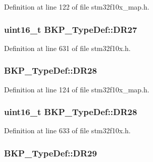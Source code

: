 Definition at line 122 of file stm32f10x\+\_\+map.\+h.

\subsubsection[{\texorpdfstring{D\+R27}{DR27}}]{ {\bf uint16\+\_\+t} B\+K\+P\+\_\+\+Type\+Def\+::\+D\+R27}\hypertarget{struct_b_k_p___type_def_ad5e851ff7c4e78c3ec10bedf4cbec918}{}\label{struct_b_k_p___type_def_ad5e851ff7c4e78c3ec10bedf4cbec918}


Definition at line 631 of file stm32f10x.\+h.

\subsubsection[{\texorpdfstring{D\+R28}{DR28}}]{ B\+K\+P\+\_\+\+Type\+Def\+::\+D\+R28}\hypertarget{struct_b_k_p___type_def_afa8097c9d734aaba46f287d38e562032}{}\label{struct_b_k_p___type_def_afa8097c9d734aaba46f287d38e562032}


Definition at line 124 of file stm32f10x\+\_\+map.\+h.

\subsubsection[{\texorpdfstring{D\+R28}{DR28}}]{ {\bf uint16\+\_\+t} B\+K\+P\+\_\+\+Type\+Def\+::\+D\+R28}\hypertarget{struct_b_k_p___type_def_a741b11fc49b1b78afeb0585844b1f12d}{}\label{struct_b_k_p___type_def_a741b11fc49b1b78afeb0585844b1f12d}


Definition at line 633 of file stm32f10x.\+h.

\subsubsection[{\texorpdfstring{D\+R29}{DR29}}]{ B\+K\+P\+\_\+\+Type\+Def\+::\+D\+R29}\hypertarget{struct_b_k_p___type_def_a25286f92dc63b51fec971f96eca41860}{}\label{struct_b_k_p___type_def_a25286f92dc63b51fec971f96eca41860}


